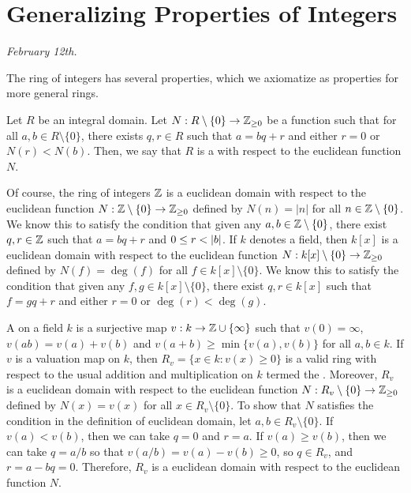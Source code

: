 \section{Generalizing Properties of Integers}
\textit{February 12th.}

The ring of integers has several properties, which we axiomatize as properties for more general rings.

\begin{definition}
    Let $R$ be an integral domain. Let $N: R \setminus \{0\} \to \mathbb{Z}_{\geq 0}$ be a function such that for all $a,b \in R \setminus \{0\}$, there exists $q,r \in R$ such that $a = bq + r$ and either $r = 0$ or $N(r) < N(b)$. Then, we say that $R$ is a  with respect to the euclidean function $N$.
\end{definition}

Of course, the ring of integers $\mathbb{Z}$ is a euclidean domain with respect to the euclidean function $N:\mathbb{Z}\setminus\{0\} \to \mathbb{Z}_{\geq 0}$ defined by $N(n) = |n|$ for all $n \in \mathbb{Z} \setminus \{0\}$. We know this to satisfy the condition that given any $a,b \in \mathbb{Z} \setminus \{0\}$, there exist $q,r \in \mathbb{Z}$ such that $a = bq + r$ and $0 \leq r < \left| b \right|$. If $k$ denotes a field, then $k[x]$ is a euclidean domain with respect to the euclidean function $N : k[x] \setminus \{0\} \to \mathbb{Z}_{\geq 0}$ defined by $N(f) = \deg(f)$ for all $f \in k[x] \setminus \{0\}$. We know this to satisfy the condition that given any $f,g \in k[x] \setminus \{0\}$, there exist $q,r \in k[x]$ such that $f = gq + r$ and either $r = 0$ or $\deg(r) < \deg(g)$.

\begin{example}
    A  on a field $k$ is a surjective map $v : k \to \mathbb{Z} \cup \{\infty\}$ such that $v(0) = \infty$, $v(ab) = v(a) + v(b)$ and $v(a+b) \geq \min\{v(a), v(b)\}$ for all $a,b \in k$. If $v$ is a valuation map on $k$, then $R_{v} = \{x \in k : v(x) \geq 0\}$ is a valid ring with respect to the usual addition and multiplication on $k$ termed the . Moreover, $R_{v}$ is a euclidean domain with respect to the euclidean function $N : R_{v} \setminus \{0\} \to \mathbb{Z}_{\geq 0}$ defined by $N(x) = v(x)$ for all $x \in R_{v} \setminus \{0\}$. To show that $N$ satisfies the condition in the definition of euclidean domain, let $a,b \in R_{v} \setminus \{0\}$. If $v(a) < v(b)$, then we can take $q = 0$ and $r = a$. If $v(a) \geq v(b)$, then we can take $q = a/b$ so that $v(a/b) = v(a) - v(b) \geq 0$, so $q \in R_{v}$, and $r = a - bq = 0$. Therefore, $R_{v}$ is a euclidean domain with respect to the euclidean function $N$.
\end{example}



